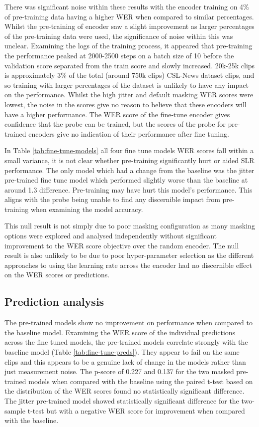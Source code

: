 \documentclass{article}
\begin{document}
There was significant noise within these results with the encoder training on 4\% of pre-training data having a higher WER when compared to similar percentages. Whilst the pre-training of encoder saw a slight improvement as larger percentages of the pre-training data were used, the significance of noise within this was unclear. Examining the logs of the training process, it appeared that pre-training the performance peaked at 2000-2500 steps on a batch size of 10 before the validation score separated from the train score and slowly increased. 20k-25k clips is approximately 3\% of the total (around 750k clips) CSL-News dataset clips, and so training with larger percentages of the dataset is unlikely to have any impact on the performance. Whilst the high jitter and default masking WER scores were lowest, the noise in the scores give no reason to believe that these encoders will have a higher performance. The WER score of the fine-tune encoder gives confidence that the probe can be trained, but the scores of the probe for pre-trained encoders give no indication of their performance after fine tuning.

In Table \ref{tab:fine-tune-models} all four fine tune models WER scores fall within a small variance, it is not clear whether pre-training significantly hurt or aided SLR performance. The only model which had a change from the baseline was the jitter pre-trained fine tune model which performed slightly worse than the baseline at around 1.3 difference. Pre-training may have hurt this model's performance. This aligns with the probe being unable to find any discernible impact from pre-training when examining the model accuracy. 

This null result is not simply due to poor masking configuration as many masking options were explored and analysed independently without significant improvement to the WER score objective over the random encoder. The null result is also unlikely to be due to poor hyper-parameter selection as the different approaches to using the learning rate across the encoder had no discernible effect on the WER scores or predictions. 

\subsection{Prediction analysis}
The pre-trained models show no improvement on performance when compared to the baseline model. Examining the WER score of the individual predictions across the fine tuned models, the pre-trained models correlate strongly with the baseline model (Table \ref{tab:fine-tune-preds}). They appear to fail on the same clips and this appears to be a genuine lack of change in the models rather than just measurement noise. The p-score of 0.227 and 0.137 for the two masked pre-trained models when compared with the baseline using the paired t-test based on the distribution of the WER scores found no statistically significant difference. The jitter pre-trained model showed statistically significant difference for the two-sample t-test but with a negative WER score for improvement when compared with the baseline. 
\end{document}
